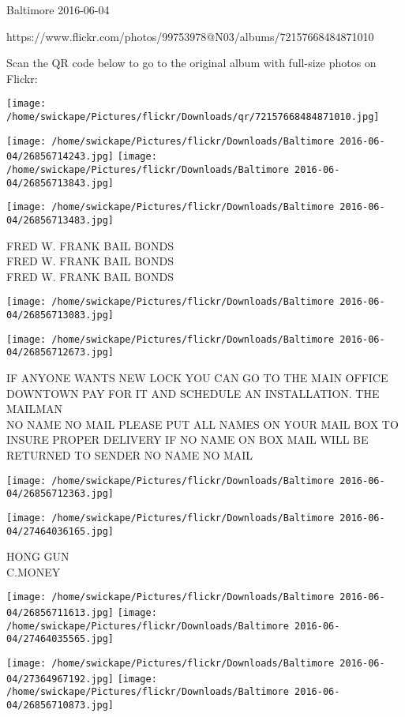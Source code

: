 \documentclass[10pt,letterpaper]{article}
\begin{document}
Baltimore 2016-06-04

https://www.flickr.com/photos/99753978@N03/albums/72157668484871010

Scan the QR code below to go to the original album with full-size photos on Flickr:

\texttt{[image: /home/swickape/Pictures/flickr/Downloads/qr/72157668484871010.jpg]}
\pagebreak

\texttt{[image: /home/swickape/Pictures/flickr/Downloads/Baltimore 2016-06-04/26856714243.jpg]}
\texttt{[image: /home/swickape/Pictures/flickr/Downloads/Baltimore 2016-06-04/26856713843.jpg]}

\texttt{[image: /home/swickape/Pictures/flickr/Downloads/Baltimore 2016-06-04/26856713483.jpg]}

FRED W. FRANK BAIL BONDS\\
FRED W. FRANK BAIL BONDS\\
FRED W. FRANK BAIL BONDS
\pagebreak

\texttt{[image: /home/swickape/Pictures/flickr/Downloads/Baltimore 2016-06-04/26856713083.jpg]}

\vspace{0.25in}
\texttt{[image: /home/swickape/Pictures/flickr/Downloads/Baltimore 2016-06-04/26856712673.jpg]}

IF ANYONE WANTS NEW LOCK YOU CAN GO TO THE MAIN OFFICE DOWNTOWN PAY FOR IT AND SCHEDULE AN INSTALLATION. THE MAILMAN\\
NO NAME NO MAIL PLEASE PUT ALL NAMES ON YOUR MAIL BOX TO INSURE PROPER DELIVERY IF NO NAME ON BOX MAIL WILL BE RETURNED TO SENDER NO NAME NO MAIL
\pagebreak

\texttt{[image: /home/swickape/Pictures/flickr/Downloads/Baltimore 2016-06-04/26856712363.jpg]}

\vspace{0.25in}
\texttt{[image: /home/swickape/Pictures/flickr/Downloads/Baltimore 2016-06-04/27464036165.jpg]}

HONG GUN\\
C.MONEY
\pagebreak

\texttt{[image: /home/swickape/Pictures/flickr/Downloads/Baltimore 2016-06-04/26856711613.jpg]}
\texttt{[image: /home/swickape/Pictures/flickr/Downloads/Baltimore 2016-06-04/27464035565.jpg]}

\texttt{[image: /home/swickape/Pictures/flickr/Downloads/Baltimore 2016-06-04/27364967192.jpg]}
\texttt{[image: /home/swickape/Pictures/flickr/Downloads/Baltimore 2016-06-04/26856710873.jpg]}
\end{document}
